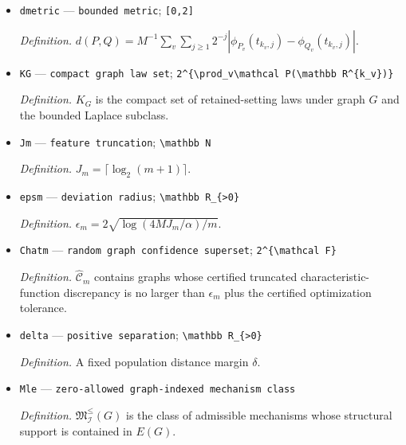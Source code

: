 \documentclass{article}
\begin{document}
\begin{itemize}
  \par\smallskip\noindent\emph{Definition.} A second response-law tuple \(Q=(Q_v)_{v=1}^M\).
  \item \texttt{dmetric} --- \texttt{bounded metric}; \texttt{[0,\allowbreak{}2]}
  \par\smallskip\noindent\emph{Definition.} \(d(P,Q)=M^{-1}\sum_v\sum_{j\ge1}2^{-j}|\phi_{P_v}(t_{k_v,j})-\phi_{Q_v}(t_{k_v,j})|\).
  \item \texttt{KG} --- \texttt{compact graph law set}; \texttt{2\textasciicircum{}\{\textbackslash{}\allowbreak{}prod\_\allowbreak{}v\textbackslash{}\allowbreak{}mathcal P(\textbackslash{}\allowbreak{}mathbb R\textasciicircum{}\{k\_\allowbreak{}v\}\allowbreak{})\}\allowbreak{}}
  \par\smallskip\noindent\emph{Definition.} \(K_G\) is the compact set of retained-setting laws under graph \(G\) and the bounded Laplace subclass.
  \item \texttt{Jm} --- \texttt{feature truncation}; \texttt{\textbackslash{}\allowbreak{}mathbb N}
  \par\smallskip\noindent\emph{Definition.} \(J_m=\lceil\log_2(m+1)\rceil\).
  \item \texttt{epsm} --- \texttt{deviation radius}; \texttt{\textbackslash{}\allowbreak{}mathbb R\_\allowbreak{}\{>0\}\allowbreak{}}
  \par\smallskip\noindent\emph{Definition.} \(\epsilon_m=2\sqrt{\log(4MJ_m/\alpha)/m}\).
  \item \texttt{Chatm} --- \texttt{random graph confidence superset}; \texttt{2\textasciicircum{}\{\textbackslash{}\allowbreak{}mathcal F\}\allowbreak{}}
  \par\smallskip\noindent\emph{Definition.} \(\widehat{\mathcal C}_m\) contains graphs whose certified truncated characteristic-function discrepancy is no larger than \(\epsilon_m\) plus the certified optimization tolerance.
  \item \texttt{delta} --- \texttt{positive separation}; \texttt{\textbackslash{}\allowbreak{}mathbb R\_\allowbreak{}\{>0\}\allowbreak{}}
  \par\smallskip\noindent\emph{Definition.} A fixed population distance margin \(\delta\).
  \item \texttt{Mle} --- \texttt{zero-\allowbreak{}allowed graph-\allowbreak{}indexed mechanism class}
  \par\smallskip\noindent\emph{Definition.} \(\mathfrak M^{\le}_{\mathcal I}(G)\) is the class of admissible mechanisms whose structural support is contained in \(E(G)\).

\end{itemize}
\end{document}
